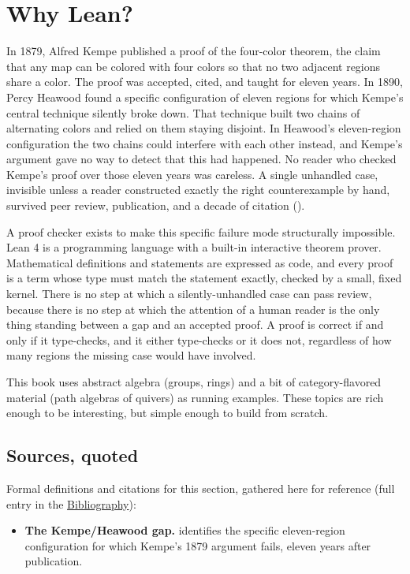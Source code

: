 \section{Why Lean?}\label{sec:00-setup:01-why-lean:1}

In 1879, Alfred Kempe published a proof of the four-color theorem, the claim that any map can be colored with four colors so that no two adjacent regions share a color. The proof was accepted, cited, and taught for eleven years. In 1890, Percy Heawood found a specific configuration of eleven regions for which Kempe's central technique silently broke down. That technique built two chains of alternating colors and relied on them staying disjoint. In Heawood's eleven-region configuration the two chains could interfere with each other instead, and Kempe's argument gave no way to detect that this had happened. No reader who checked Kempe's proof over those eleven years was careless. A single unhandled case, invisible unless a reader constructed exactly the right counterexample by hand, survived peer review, publication, and a decade of citation (\cite{Heawood1890}).

A proof checker exists to make this specific failure mode structurally impossible. Lean 4 is a programming language with a built-in interactive theorem prover. Mathematical definitions and statements are expressed as code, and every proof is a term whose type must match the statement exactly, checked by a small, fixed kernel. There is no step at which a silently-unhandled case can pass review, because there is no step at which the attention of a human reader is the only thing standing between a gap and an accepted proof. A proof is correct if and only if it type-checks, and it either type-checks or it does not, regardless of how many regions the missing case would have involved.

This book uses abstract algebra (groups, rings) and a bit of category-flavored material (path algebras of quivers) as running examples. These topics are rich enough to be interesting, but simple enough to build from scratch.

\subsection{Sources, quoted}\label{sec:00-setup:01-why-lean:2}

Formal definitions and citations for this section, gathered here for reference (full entry in the \hyperref[sec:root:bibliography:1]{Bibliography}):

\begin{itemize}
\tightlist
\item
  \textbf{The Kempe/Heawood gap.} \cite{Heawood1890} identifies the specific eleven-region configuration for which Kempe's 1879 argument fails, eleven years after publication.
\end{itemize}
